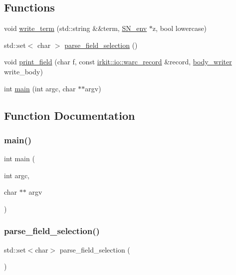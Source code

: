 \subsection*{Functions}
\begin{DoxyCompactItemize}
\item 
void \mbox{\hyperlink{irk-warc_8cpp_a44adaf0886fa4ffc57f8ea4447218597}{write\+\_\+term}} (std\+::string \&\&term, \mbox{\hyperlink{structSN__env}{S\+N\+\_\+env}} $\ast$z, bool lowercase)
\item 
std\+::set$<$ char $>$ \mbox{\hyperlink{irk-warc_8cpp_a540445d56c199741b8ec16c28c40f5e0}{parse\+\_\+field\+\_\+selection}} ()
\item 
void \mbox{\hyperlink{irk-warc_8cpp_aeaa9afcbcca6c9cac8dfed13f3ec5b3d}{print\+\_\+field}} (char f, const \mbox{\hyperlink{classirkit_1_1io_1_1warc__record}{irkit\+::io\+::warc\+\_\+record}} \&record, \mbox{\hyperlink{structbody__writer}{body\+\_\+writer}} write\+\_\+body)
\item 
int \mbox{\hyperlink{irk-warc_8cpp_a3c04138a5bfe5d72780bb7e82a18e627}{main}} (int argc, char $\ast$$\ast$argv)
\end{DoxyCompactItemize}


\subsection{Function Documentation}
\mbox{\label{irk-warc_8cpp_a3c04138a5bfe5d72780bb7e82a18e627}} 
\subsubsection{\texorpdfstring{main()}{main()}}
{\footnotesize\ttfamily int main (\begin{DoxyParamCaption}\item[{int}]{argc,  }\item[{char $\ast$$\ast$}]{argv }\end{DoxyParamCaption})}

\mbox{\label{irk-warc_8cpp_a540445d56c199741b8ec16c28c40f5e0}} 
\subsubsection{\texorpdfstring{parse\+\_\+field\+\_\+selection()}{parse\_field\_selection()}}
{\footnotesize\ttfamily std\+::set$<$char$>$ parse\+\_\+field\+\_\+selection (\begin{DoxyParamCaption}{ }\end{DoxyParamCaption})}


